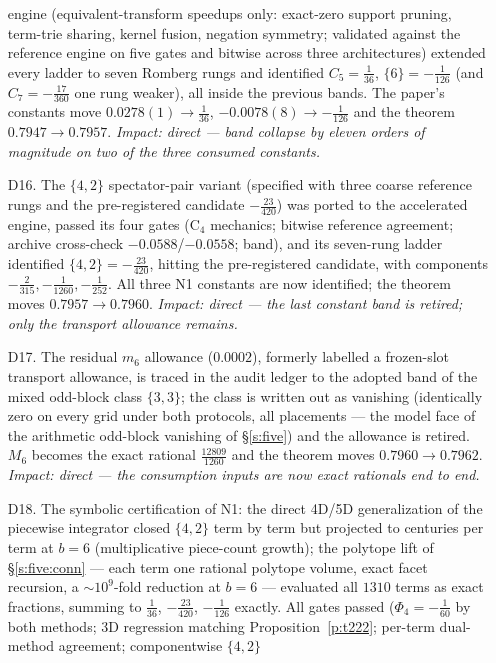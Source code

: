 \documentclass[11pt]{article}
\numberwithin{equation}{section}
\theoremstyle{definition}
\theoremstyle{remark}
\begin{document}
\begin{itemize}
engine (equivalent-transform speedups only: exact-zero support
pruning, term-trie sharing, kernel fusion, negation symmetry;
validated against the reference engine on five gates and
bitwise across three architectures) extended every ladder to
seven Romberg rungs and identified $C_5=\tfrac1{36}$,
$\{6\}=-\tfrac1{126}$ (and $C_7=-\tfrac{17}{360}$ one rung
weaker), all inside the previous bands. The paper's constants
move $0.0278(1)\to\tfrac1{36}$, $-0.0078(8)\to-\tfrac1{126}$
and the theorem $0.7947\to0.7957$. \emph{Impact: direct ---
band collapse by eleven orders of magnitude on two of the
three consumed constants.}
\item[D16.] The $\{4,2\}$ spectator-pair variant (specified
with three coarse reference rungs and the pre-registered
candidate $-\tfrac{23}{420}$) was ported to the accelerated
engine, passed its four gates (C$_4$ mechanics; bitwise
reference agreement; archive cross-check
$-0.0588$/$-0.0558$; band), and its seven-rung ladder
identified $\{4,2\}=-\tfrac{23}{420}$, hitting the
pre-registered candidate, with components
$-\tfrac2{315},-\tfrac1{1260},-\tfrac1{252}$. All three N1
constants are now identified; the theorem moves
$0.7957\to0.7960$. \emph{Impact: direct --- the last
constant band is retired; only the transport allowance
remains.}
\item[D17.] The residual $m_6$ allowance ($0.0002$), formerly
labelled a frozen-slot transport allowance, is traced in the
audit ledger to the adopted band of the mixed odd-block class
$\{3,3\}$; the class is written out as vanishing (identically
zero on every grid under both protocols, all placements ---
the model face of the arithmetic odd-block vanishing of
\S\ref{s:five}) and the allowance is retired. $M_6$ becomes
the exact rational $\tfrac{12809}{1260}$ and the theorem moves
$0.7960\to0.7962$. \emph{Impact: direct --- the consumption
inputs are now exact rationals end to end.}
\item[D18.] The symbolic certification of N1: the direct
4D/5D generalization of the piecewise integrator closed
$\{4,2\}$ term by term but projected to centuries per term at
$b=6$ (multiplicative piece-count growth); the polytope lift
of \S\ref{s:five:conn} --- each term one rational polytope
volume, exact facet recursion, a $\sim10^{9}$-fold reduction
at $b=6$ --- evaluated all $1310$ terms as exact fractions,
summing to $\tfrac1{36}$, $-\tfrac{23}{420}$, $-\tfrac1{126}$
exactly. All gates passed ($\Phi_4=-\tfrac1{60}$ by both
methods; 3D regression matching Proposition~\ref{p:t222};
per-term dual-method agreement; componentwise $\{4,2\}$

\end{itemize}
\end{document}
